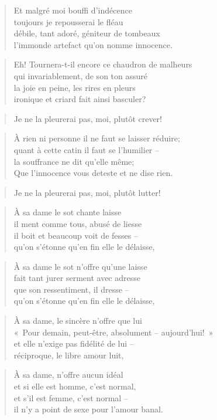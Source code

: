   \begin{verse}
    Et malgré moi bouffi d’indécence\\
    toujours je repousserai le fléau\\
    débile, tant adoré, géniteur de tombeaux\\
    l’immonde artefact qu’on nomme innocence.
  \end{verse}
  \begin{verse}
    Eh! Tournera-t-il encore ce chaudron de malheurs\\
    qui invariablement, de son ton assuré\\
    la joie en peine, les rires en pleurs\\
    ironique et criard fait ainsi basculer?
  \end{verse}
  \begin{verse}
    Je ne la pleurerai pas, moi, plutôt crever!
  \end{verse}
  \begin{verse}
    À rien ni personne il ne faut se laisser réduire;\\
    quant à cette catin il faut se l’humilier --\\
    la souffrance ne dit qu’elle même;\\
    Que l’innocence vous deteste et ne dise rien.
  \end{verse}
  \begin{verse}
    Je ne la pleurerai pas, moi, plutôt lutter!
  \end{verse}

  \begin{verse}
    À sa dame le sot chante laisse\\
    il ment comme tous, abusé de liesse\\
    il boit et beaucoup voit de fesses --\\
    qu’on s’étonne qu’en fin elle le délaisse,
  \end{verse}
  \begin{verse}
    À sa dame le sot n’offre qu’une laisse\\
    fait tant jurer serment avec adresse\\
    que son ressentiment, il dresse --\\
    qu’on s’étonne qu’en fin elle le délaisse,
  \end{verse}
  \begin{verse}
    À sa dame, le sincère n’offre que lui\\
    «~Pour demain, peut-être, absolument -- aujourd’hui!~»\\
    et elle n’exige pas fidélité de lui --\\
    réciproque, le libre amour luit,
  \end{verse}
  \begin{verse}
    À sa dame, n’offre aucun idéal\\
    et si elle est homme, c’est normal,\\
    et s’il est femme, c’est normal --\\
    il n’y a point de sexe pour l’amour banal.
  \end{verse}

